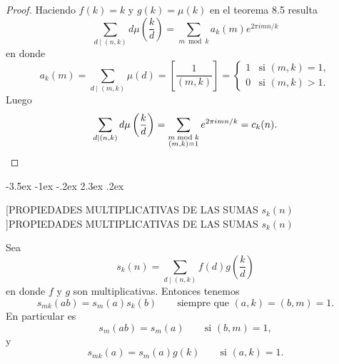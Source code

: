 \documentclass[12pt,a4paper]{book}
\makeatletter
\renewcommand\section{\@startsection{section}{1}{\z@}%
  {-3.5ex \@plus -1ex \@minus -.2ex}%
  {2.3ex \@plus .2ex}%
  {\normalfont\Large\bfseries\raggedright}}
\makeatother
\begin{document}
    \begin{proof}
        Haciendo $f(k)=k$ y $g(k)=\mu(k)$ en el teorema 8.5 resulta
        \begin{equation*}
            \sum_{d\mid(n,k)}d\mu\left(\frac{k}{d}\right)=\sum_{m\bmod k}a_{k}(m)e^{2\pi imn/k}
        \end{equation*}
        en donde
        \begin{equation*}
            a_{k}(m)=\sum_{d\mid(m,k)}\mu(d)=\left[\frac{1}{(m,k)}\right]=
            \begin{cases}
                1&\text{si }(m,k)=1,\\
                0&\text{si }(m,k)>1.
            \end{cases}
        \end{equation*}
        Luego
        \begin{equation*}
            \sum_{d\mid(n,k)}d\mu\left(\frac{k}{d}\right)=\sum_{\substack{m\bmod k\\(m,k)=1}}e^{2\pi imn/k}=c_{k}(n).\qedhere
        \end{equation*}
    \end{proof}

    \section[PROPIEDADES MULTIPLICATIVAS DE LAS SUMAS \texorpdfstring{$s_{k}(n)$}{sk(n)}]{PROPIEDADES MULTIPLICATIVAS DE LAS SUMAS \texorpdfstring{$s_{k}(n)$}{sk(n)}}

    \begin{teorema}
        Sea
        \begin{equation*}
            s_{k}(n)=\sum_{d\mid(n,k)}f(d)g\left(\frac{k}{d}\right)
        \end{equation*}
        en donde $f$ y $g$ son multiplicativas. Entonces tenemos
        \begin{equation}\label{eq:8-9}
            s_{mk}(ab)=s_{m}(a)s_{k}(b)\qquad\text{siempre que }(a,k)=(b,m)=1.
        \end{equation}
        En particular es
        \begin{equation}\label{eq:8-10}
            s_{m}(ab)=s_{m}(a)\qquad\text{si }(b,m)=1,
        \end{equation}
        y
        \begin{equation}\label{eq:8-11}
            s_{mk}(a)=s_{m}(a)g(k)\qquad\text{si }(a,k)=1.
        \end{equation}
    \end{teorema}
\end{document}
